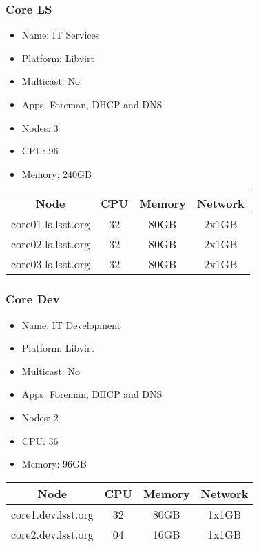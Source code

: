 \newpage
\subsubsection{Core LS}
\begin{itemize}
  \itemsep0em 
  \item Name:      IT Services
  \item Platform:  Libvirt
  \item Multicast: No
  \item Apps:      Foreman, DHCP and DNS
  \item Nodes:     3
  \item CPU:       96
  \item Memory:    240GB
\end{itemize}
\begin{center}
  \small
  \begin{tabular}{||c c c c||} 
    \hline
    Node & CPU & Memory & Network \\ [0.5ex]
    \hline
    core01.ls.lsst.org & 32 & 80GB & 2x1GB \\
    \hline
    core02.ls.lsst.org & 32 & 80GB & 2x1GB \\
    \hline
    core03.ls.lsst.org & 32 & 80GB & 2x1GB \\
    \hline
  \end{tabular}
\end{center}

\subsubsection{Core Dev}
\begin{itemize}
  \itemsep0em 
  \item Name:      IT Development
  \item Platform:  Libvirt
  \item Multicast: No
  \item Apps:      Foreman, DHCP and DNS
  \item Nodes:     2
  \item CPU:       36
  \item Memory:    96GB
\end{itemize}
\begin{center}
  \small
  \begin{tabular}{||c c c c||}
    \hline
    Node & CPU & Memory & Network \\ [0.5ex]
    \hline
    core1.dev.lsst.org & 32 & 80GB & 1x1GB \\
    \hline
    core2.dev.lsst.org & 04 & 16GB & 1x1GB \\
    \hline
  \end{tabular}
\end{center}

